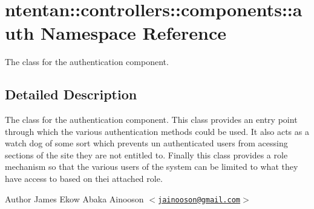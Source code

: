 \hypertarget{namespacententan_1_1controllers_1_1components_1_1auth}{
\section{ntentan::controllers::components::auth Namespace Reference}
\label{namespacententan_1_1controllers_1_1components_1_1auth}
}


The class for the authentication component.  




\subsection{Detailed Description}
The class for the authentication component. This class provides an entry point through which the various authentication methods could be used. It also acts as a watch dog of some sort which prevents un authenticated users from acessing sections of the site they are not entitled to. Finally this class provides a role mechanism so that the various users of the system can be limited to what they have access to based on thei attached role.

\begin{DoxyAuthor}{Author}
James Ekow Abaka Ainooson $<$\href{mailto:jainooson@gmail.com}{\tt jainooson@gmail.com}$>$ 
\end{DoxyAuthor}

